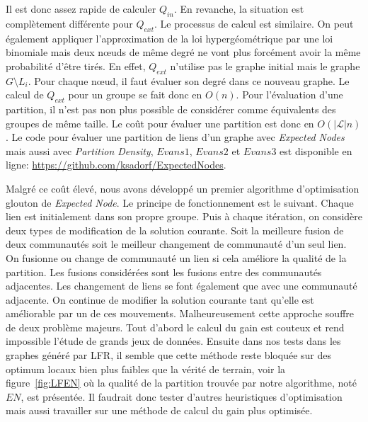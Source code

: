 Il est donc assez rapide de calculer $Q_{in}$.
En revanche, la situation est complètement différente pour $Q_{ext}$.
Le processus de calcul est similaire.
On peut également appliquer l'approximation de la loi hypergéométrique par une loi binomiale mais deux n\oe uds de même degré ne vont plus forcément avoir la même probabilité d'être tirés.
En effet, $Q_{ext}$ n'utilise pas le graphe initial mais le graphe $G\setminus L_i$.
Pour chaque n\oe ud, il faut évaluer son degré dans ce nouveau graphe.
Le calcul de $Q_{ext}$ pour un groupe se fait donc en $O(n)$.
Pour l'évaluation d'une partition, il n'est pas non plus possible de considérer comme équivalents des groupes de même taille.
Le coût pour évaluer une partition est donc en $O(|\mathcal{L}|n)$.
Le code pour évaluer une partition de liens d'un graphe avec \emph{Expected Nodes} mais aussi avec \emph{Partition Density}, $Evans1$, $Evans2$ et $Evans3$ est disponible en ligne: \url{https://github.com/ksadorf/ExpectedNodes}.


Malgré ce coût élevé, nous avons développé un premier algorithme d'optimisation glouton de \emph{Expected Node}.
Le principe de fonctionnement est le suivant.
Chaque lien est initialement dans son propre groupe.
Puis à chaque itération, on considère deux types de modification de la solution courante.
Soit la meilleure fusion de deux communautés soit le meilleur changement de communauté d'un seul lien.
On fusionne ou change de communauté un lien si cela améliore la qualité de la partition.
Les fusions considérées sont les fusions entre des communautés adjacentes.
Les changement de liens se font également que avec une communauté adjacente.
On continue de modifier la solution courante tant qu'elle est améliorable par un de ces mouvements.
Malheureusement cette approche souffre de deux problème majeurs.
Tout d'abord le calcul du gain est couteux et rend impossible l'étude de grands jeux de données.
Ensuite dans nos tests dans les graphes généré par LFR, il semble que cette méthode reste bloquée sur des optimum locaux bien plus faibles que la vérité de terrain, voir la figure~\ref{fig:LFEN} où la qualité de la partition trouvée par notre algorithme, noté $EN$, est présentée.
Il faudrait donc tester d'autres heuristiques d'optimisation mais aussi travailler sur une méthode de calcul du gain plus optimisée.

